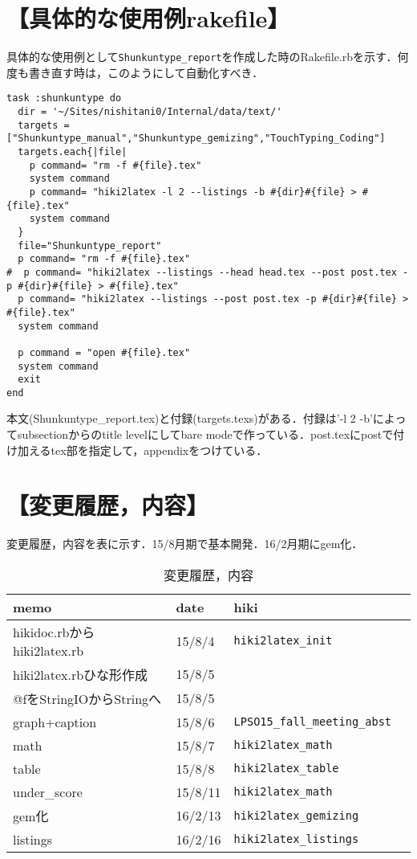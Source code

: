 \documentclass[12pt,a4paper]{jsarticle}
\begin{document}
\section{【具体的な使用例rakefile】}
具体的な使用例として\verb|Shunkuntype_report|を作成した時のRakefile.rbを示す．何度も書き直す時は，このようにして自動化すべき．
\begin{lstlisting}[style=customRuby]
task :shunkuntype do
  dir = '~/Sites/nishitani0/Internal/data/text/'
  targets =["Shunkuntype_manual","Shunkuntype_gemizing","TouchTyping_Coding"]
  targets.each{|file|
    p command= "rm -f #{file}.tex"
    system command
    p command= "hiki2latex -l 2 --listings -b #{dir}#{file} > #{file}.tex"
    system command
  }
  file="Shunkuntype_report"
  p command= "rm -f #{file}.tex"
#  p command= "hiki2latex --listings --head head.tex --post post.tex -p #{dir}#{file} > #{file}.tex"
  p command= "hiki2latex --listings --post post.tex -p #{dir}#{file} > #{file}.tex"
  system command

  p command = "open #{file}.tex"
  system command
  exit
end
\end{lstlisting}
本文(Shunkuntype\_report.tex)と付録(targets.texs)がある．付録は'-l 2 -b'によってsubsectionからのtitle levelにしてbare modeで作っている．post.texにpostで付け加えるtex部を指定して，appendixをつけている．

\section{【変更履歴，内容】}
変更履歴，内容を表に示す．15/8月期で基本開発．16/2月期にgem化．

\begin{table}[htbp]\begin{center}
\caption{変更履歴，内容}
\begin{tabular}{llll}
\hline
memo   &date  &hiki  \\ \hline
hikidoc.rbからhiki2latex.rb  &15/8/4  &\verb|hiki2latex_init|  \\
hiki2latex.rbひな形作成  &15/8/5  \\
@fをStringIOからStringへ  &15/8/5  \\
graph+caption  &15/8/6  &\verb|LPSO15_fall_meeting_abst|  \\
math  &15/8/7  &\verb|hiki2latex_math|  \\
table  &15/8/8  &\verb|hiki2latex_table|  \\
under\_score  &15/8/11   &\verb|hiki2latex_math|  \\
gem化  &16/2/13   &\verb|hiki2latex_gemizing|  \\
listings  &16/2/16   &\verb|hiki2latex_listings|  \\
\hline
\end{tabular}
\label{default}
\end{center}\end{table}
\end{document}
